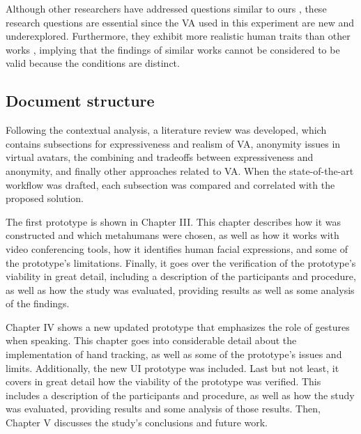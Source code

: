 Although other researchers have addressed questions similar to ours \cite{LU21, ZAL18, GRA07, LUC14, ROT19, KAN16, KAN10A, BAC19}, these research questions are essential since the VA used in this experiment are new and underexplored. Furthermore, they exhibit more realistic human traits than other works \cite{LU21, ZAL18, GRA07, LUC14, ROT19, KAN16, KAN10A, BAC19}, implying that the findings of similar works cannot be considered to be valid because the conditions are distinct.

\subsection{Document structure}
Following the contextual analysis, a literature review was developed, which contains subsections for expressiveness and realism of VA, anonymity issues in virtual avatars, the combining and tradeoffs between expressiveness and anonymity, and finally other approaches related to VA. When the state-of-the-art workflow was drafted, each subsection was compared and correlated with the proposed solution.

The first prototype is shown in Chapter III. This chapter describes how it was constructed and which metahumans were chosen, as well as how it works with video conferencing tools, how it identifies human facial expressions, and some of the prototype's limitations. Finally, it goes over the verification of the prototype's viability in great detail, including a description of the participants and procedure, as well as how the study was evaluated, providing results as well as some analysis of the findings.

Chapter IV shows a new updated prototype that emphasizes the role of gestures when speaking. This chapter goes into considerable detail about the implementation of hand tracking, as well as some of the prototype's issues and limits. Additionally, the new UI prototype was included. Last but not least, it covers in great detail how the viability of the prototype was verified. This includes a description of the participants and procedure, as well as how the study was evaluated, providing results and some analysis of those results. Then, Chapter V discusses the study's conclusions and future work.